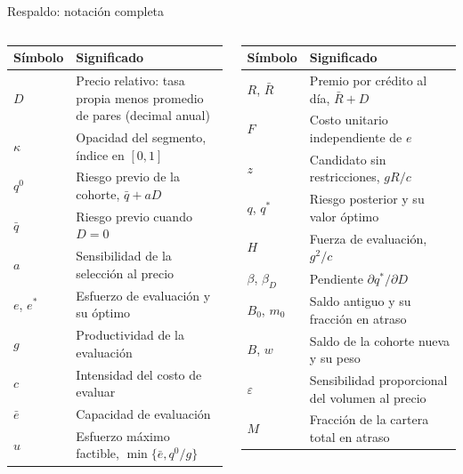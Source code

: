 \documentclass[aspectratio=169,10pt,t]{beamer}
\newcommand{\qz}{q^{0}}
\newcommand{\qs}{q^{*}}
\newcommand{\es}{e^{*}}
\newcommand{\eb}{\bar e}
\begin{document}
\begin{frame}{Respaldo: notación completa}
\vspace{1.5mm}
\footnotesize
\renewcommand{\arraystretch}{1.1}
\begin{columns}[T,onlytextwidth]
\begin{tabular}{@{}p{.16\linewidth}p{.78\linewidth}@{}}
\toprule \textbf{Símbolo} & \textbf{Significado}\\\midrule
$D$ & Precio relativo: tasa propia menos promedio de pares (decimal anual)\\
$\kappa$ & Opacidad del segmento, índice en $[0,1]$\\
$\qz$ & Riesgo previo de la cohorte, $\bar q+aD$\\
$\bar q$ & Riesgo previo cuando $D=0$\\
$a$ & Sensibilidad de la selección al precio\\
$e$, $\es$ & Esfuerzo de evaluación y su óptimo\\
$g$ & Productividad de la evaluación\\
$c$ & Intensidad del costo de evaluar\\
$\eb$ & Capacidad de evaluación\\
$u$ & Esfuerzo máximo factible, $\min\{\eb,\qz/g\}$\\\bottomrule
\end{tabular}
\begin{tabular}{@{}p{.16\linewidth}p{.78\linewidth}@{}}
\toprule \textbf{Símbolo} & \textbf{Significado}\\\midrule
$R$, $\bar R$ & Premio por crédito al día, $\bar R+D$\\
$F$ & Costo unitario independiente de $e$\\
$z$ & Candidato sin restricciones, $gR/c$\\
$q$, $\qs$ & Riesgo posterior y su valor óptimo\\
$H$ & Fuerza de evaluación, $g^{2}/c$\\
$\beta$, $\beta_{D}$ & Pendiente $\partial\qs/\partial D$\\
$B_{0}$, $m_{0}$ & Saldo antiguo y su fracción en atraso\\
$B$, $w$ & Saldo de la cohorte nueva y su peso\\
$\varepsilon$ & Sensibilidad proporcional del volumen al precio\\
$M$ & Fracción de la cartera total en atraso\\\bottomrule
\end{tabular}
\end{columns}
\end{frame}
\end{document}
